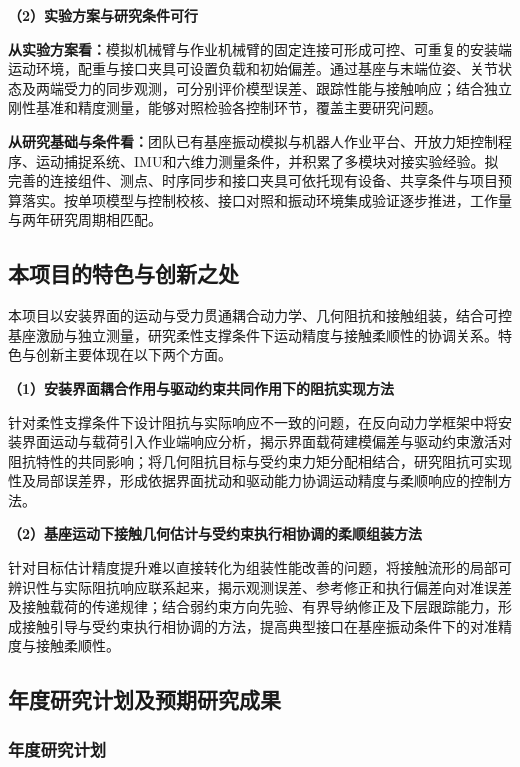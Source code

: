 \documentclass[UTF8,a4paper,zihao=-4,fontset=fandol]{ctexart}
\newcommand{\topic}[1]{\par\Needspace{4\baselineskip}\addvspace{0.5em}\noindent\textbf{#1}\par\nobreak}
\newcommand{\rev}[1]{{\color{red}#1}}
\begin{document}
\topic{（\rev{2}）\rev{实验方案与}研究\rev{条件可行}}

\textbf{\rev{从实验方案看：}}模拟\rev{机械臂与}作业机械臂\rev{的固定连接可形成可控、可重复的}安装端\rev{运动环境，配重与接口夹具可设置负载和初始偏差。通过基座与末端位姿、关节状态及两端}受力\rev{的同步观测，可分别评价模型误差、跟踪性能与接触响应；结合独立刚性基准和精度测量，能够对照检验各控制环节，覆盖主要研究问题。}

\textbf{\rev{从研究基础与条件看：}}\rev{团队已有基座振动模拟与机器人作业平台、开放力矩控制程序、运动捕捉系统、IMU和六维力测量条件，并积累了多模块对接实验经验。拟完善的连接组件、测点、时序同步和接口夹具可依托现有设备、共享条件与项目预算落实。按单项模型与控制}校核\rev{、接口对照和振动环境集成验证逐步推进}，\rev{工作量}与两年\rev{研究周期}相\rev{匹配}。

\subsection{本项目的特色与创新之处}

\rev{本项目以安装界面的运动与受力贯通耦合动力学、几何阻抗和接触组装，结合可控基座激励与独立测量，研究柔性支撑条件下运动精度与接触柔顺性的协调关系。特色与创新主要体现在以下两个方面。}

\topic{（1）安装界面\rev{耦合作用与驱动约束共同作用下}的\rev{阻抗实现方法}}

\rev{针对}柔性支撑条件下\rev{设计阻抗与实际响应不一致的问题，在反向动力学框架中将安装界面运动与载荷引入作业端响应分析，揭示界面载荷建模偏差与驱动约束激活对阻抗特性的共同影响；将几何阻抗目标与受约束力矩分配相结合，研究阻抗可实现性及局部误差界，形成依据界面扰动和驱动能力协调运动精度与柔顺响应}的控制方法。

\topic{（2）\rev{基座运动}下接触几何估计与受约束执行\rev{相协调的柔顺组装方法}}

\rev{针对目标估计精度提升难以直接转化为组装性能改善的问题，将接触流形的局部可辨识性与实际阻抗响应}联系起来，\rev{揭示观测误差、}参考修正\rev{和执行偏差向对准误差及接触载荷的传递规律；结合弱约束方向先验、有界导纳修正及下层跟踪能力，形成接触引导与受约束执行相协调的方法，提高典型接口在基座振动条件下的对准}精度与接触\rev{柔顺性}。

\subsection{年度研究计划及预期研究成果}

\subsubsection{年度研究计划}
\end{document}
